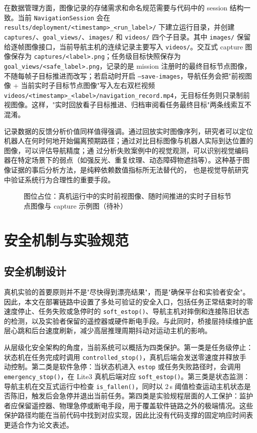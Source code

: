 在数据管理方面，图像记录的存储需求和命名规范需要与代码中的 session 结构一致。当前 \texttt{NavigationSession} 会在
\texttt{results/deployment/<timestamp>\_<run\_label>/} 下建立运行目录，并创建 \texttt{captures/}、\texttt{goal\_views/}、\texttt{images/} 和 \texttt{videos/} 四个子目录。其中 \texttt{images/} 保留给逐帧图像接口，当前导航主机的连续记录主要写入 \texttt{videos/}。交互式 capture 图像保存为 \texttt{captures/<label>.png}；任务级目标快照保存为 \texttt{goal\_views/<safe\_label>.png}，记录的是 mission 注册时的最终目标节点图像，不随每帧子目标推进而改写；若启动时开启 \texttt{--save-images}，导航任务会把"前视图像 + 当前实时子目标节点图像"写入左右双栏视频 \texttt{videos/<timestamp>\_<label>/navigation\_record.mp4}，无目标任务则只录制前视图像。这样，"实时回放看子目标推进、归档审阅看任务最终目标"两条线索互不混淆。

记录数据的反馈分析价值同样值得强调。通过回放实时图像序列，研究者可以定位机器人在何时何地开始偏离预期路径；通过对比目标图像与机器人实际到达位置的图像，可以评估导航精度；通
过分析失败案例中的视觉观测，可以识别视觉编码器在特定场景下的弱点（如强反光、重复纹理、动态障碍物遮挡等）。这种基于图像证据的事后分析方法，是纯粹依赖数值指标所无法替代的，
也是视觉导航研究中验证系统行为合理性的重要手段。

\begin{figure}[htbp]
    \centering
    \fbox{\rule{0pt}{55mm}\rule{0.86\linewidth}{0pt}}
    \caption{图位占位：真机运行中的实时前视图像、随时间推进的实时子目标节点图像与 capture 示例图（待补）}
    \label{fig:real-visualization-placeholder}
\end{figure}

\section{安全机制与实验规范}

\subsection{安全机制设计}

真机实验的首要原则并不是"尽快得到漂亮结果"，而是"确保平台和实验者安全"。因此，本文在部署链路中设置了多处可验证的安全入口，包括任务正常结束时的零速度停止、任务失败或急停时的 \texttt{soft\_estop()}、导航主机对摔倒和连接陈旧状态的检测，以及实验者保留的遥控器或硬件断电手段。与此同时，桥接层持续维护底层心跳和后台速度刷新，减少高层推理周期抖动对运动主机的影响。

从层级化安全架构的角度，当前系统可以概括为四类保护。第一类是任务级停止：状态机在任务完成时调用 \texttt{controlled\_stop()}，真机后端会发送零速度并释放手动控制。第二类是软件急停：当状态机进入 \texttt{estop} 或任务失败路径时，会调用 \texttt{emergency\_stop()}，在 Lite3 真机后端对应 \texttt{soft\_estop()}。第三类是状态监测：导航主机在交互式运行中检查 \texttt{is\_fallen()}，同时以 2\,s 阈值检查运动主机状态是否陈旧，触发后会急停并退出当前任务。第四类是实验规程层面的人工保护：监护者应保留遥控器、物理急停或断电手段，用于覆盖软件链路之外的极端情况。这些保护路径均能在当前代码中找到对应实现，因此比没有代码支撑的固定响应时间表更适合作为论文表述。

